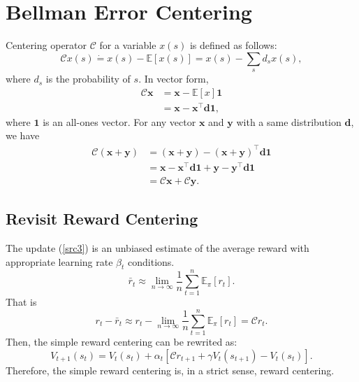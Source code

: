 \section{Bellman Error Centering}

Centering operator $\mathcal{C}$ for a variable $x(s)$ is defined as follows:
\begin{equation}
\mathcal{C}x(s)\dot{=} x(s)-\mathbb{E}[x(s)]=x(s)-\sum_s{d_{s}x(s)},
\end{equation} 
where $d_s$ is the probability of $s$.
In vector form,
\begin{equation}
\begin{split}
\mathcal{C}\bm{x} &= \bm{x}-\mathbb{E}[x]\bm{1}\\
&=\bm{x}-\bm{x}^{\top}\bm{d}\bm{1},
\end{split}
\end{equation} 
where $\bm{1}$ is an all-ones vector.
For any vector $\bm{x}$ and $\bm{y}$ with a same distribution $\bm{d}$,
we have
\begin{equation}
\begin{split}
\mathcal{C}(\bm{x}+\bm{y})&=(\bm{x}+\bm{y})-(\bm{x}+\bm{y})^{\top}\bm{d}\bm{1}\\
&=\bm{x}-\bm{x}^{\top}\bm{d}\bm{1}+\bm{y}-\bm{y}^{\top}\bm{d}\bm{1}\\
&=\mathcal{C}\bm{x}+\mathcal{C}\bm{y}.
\end{split}
\end{equation}
\subsection{Revisit Reward Centering}


The update (\ref{src3}) is an unbiased estimate of the average reward
with  appropriate learning rate $\beta_t$ conditions.
\begin{equation}
\bar{r}_{t}\approx \lim_{n\rightarrow\infty}\frac{1}{n}\sum_{t=1}^n\mathbb{E}_{\pi}[r_t].
\end{equation}
That is 
\begin{equation}
r_t-\bar{r}_{t}\approx r_t-\lim_{n\rightarrow\infty}\frac{1}{n}\sum_{t=1}^n\mathbb{E}_{\pi}[r_t]= \mathcal{C}r_t.
\end{equation}
Then, the simple reward centering can be rewrited as:
\begin{equation}
V_{t+1}(s_t)=V_{t}(s_t)+\alpha_t [\mathcal{C}r_{t+1}+\gamma V_{t}(s_{t+1})-V_t(s_t)].
\end{equation}
Therefore, the simple reward centering is, in a strict sense, reward centering.


